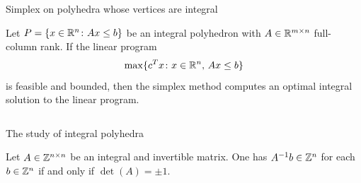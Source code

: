 \begin{frame}{Simplex on polyhedra whose vertices are integral}

  
\begin{lemma}
  \label{lem:9}
  Let $P = \{ x \in \mathbb{R}^n \colon Ax\leq b\}$ be an integral polyhedron with $A
  \in \mathbb{R}^{m\times n}$ full-column rank. If the linear program 
  \begin{equation}
    \label{eq:44}
    \max\{c^Tx \colon x \in \mathbb{R}^n, \, Ax\leq b\}
  \end{equation}
  is feasible and bounded, then the simplex method computes an optimal
  integral solution to the linear program. 
\end{lemma}


   \begin{columns}
    \begin{column}{.5\textwidth}
      
    \end{column}
    \begin{column}{.5\textwidth}
      
    \end{column}       
  \end{columns}
\end{frame}




\begin{frame}{The study of integral polyhedra}

  \begin{lemma}
  \label{po:lem:6}
  Let $A\in \mathbb{Z}^{n\times n}$ be an integral and invertible matrix. One has
  $A^{-1}b \in \mathbb{Z}^n$ for each $b \in \mathbb{Z}^n$ if and only if $\det(A)=\pm 1$.
\end{lemma}



   \begin{columns}
    \begin{column}{.5\textwidth}
      
    \end{column}
    \begin{column}{.5\textwidth}
      
    \end{column}       
  \end{columns}
\end{frame}




\begin{frame}


   \begin{columns}
    \begin{column}{.5\textwidth}
      
    \end{column}
    \begin{column}{.5\textwidth}
      
    \end{column}       
  \end{columns}
\end{frame}





